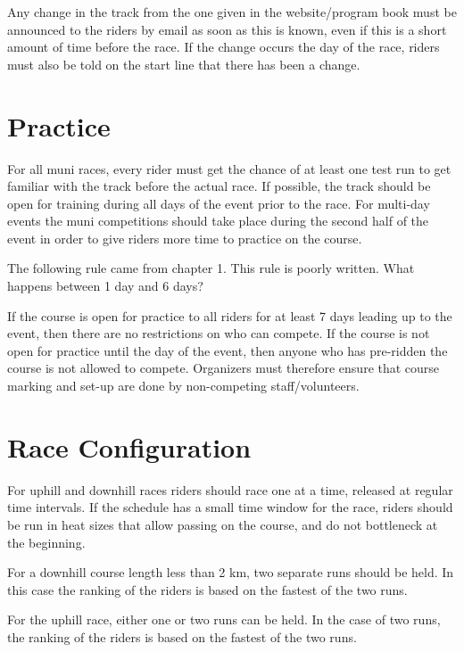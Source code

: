 Any change in the track from the one given in the website/program book must be announced to the riders by email as soon as this is known, even if this is a short amount of time before the race.
If the change occurs the day of the race, riders must also be told on the start line that there has been a change.

\section{Practice}

For all muni races, every rider must get the chance of at least one test run to get familiar with the track before the actual race.
If possible, the track should be open for training during all days of the event prior to the race.
For multi-day events the muni competitions should take place during the second half of the event in order to give riders more time to practice on the course.

\begin{comment2016}
The following rule came from chapter 1.
This rule is poorly written.
What happens between 1 day and 6 days?
\end{comment2016}

If the course is open for practice to all riders for at least 7 days leading up to the event, then there are no restrictions on who can compete.
If the course is not open for practice until the day of the event, then anyone who has pre-ridden the course is not allowed to compete.
Organizers must therefore ensure that course marking and set-up are done by non-competing staff/volunteers.

\section{Race Configuration}

For uphill and downhill races riders should race one at a time, released at regular time intervals.
If the schedule has a small time window for the race, riders should be run in heat sizes that allow passing on the course, and do not bottleneck at the beginning.

For a downhill course length less than 2 km, two separate runs should be held.
In this case the ranking of the riders is based on the fastest of the two runs.

For the uphill race, either one or two runs can be held.
In the case of two runs, the ranking of the riders is based on the fastest of the two runs.

